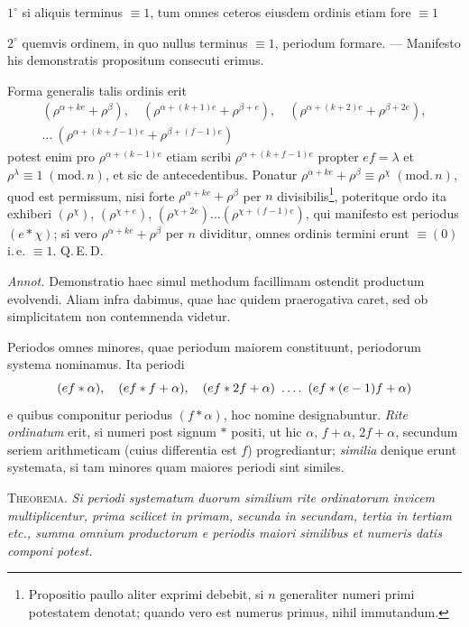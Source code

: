 %
\par\noindent $1^\circ$ si aliquis terminus $\equiv1$, tum omnes ceteros eiusdem ordinis etiam fore $\equiv1$

\noindent $2^\circ$ quemvis ordinem, in quo nullus terminus $\equiv1$, periodum formare. --- Manifesto his demonstratis propositum consecuti erimus.

Forma generalis talis ordinis erit
\[
\begin{gathered}
(\rho^{\alpha+ke}+\rho^\beta),\quad(\rho^{\alpha+(k+1)e}+\rho^{\beta+e}),\quad(\rho^{\alpha+(k+2)e}+\rho^{\beta+2e}),\\
\ldots\ (\rho^{\alpha+(k+f-1)e}+\rho^{\beta+(f-1)e})
\end{gathered}
\]
potest enim pro $\rho^{\alpha+(k-1)e}$ etiam scribi $\rho^{\alpha+(k+f-1)e}$ propter $ef=\lambda$ et $\rho^\lambda\equiv1\;(\mathrm{mod.}\,n)$, et sic de antecedentibus. Ponatur $\rho^{\alpha+ke}+\rho^\beta\equiv\rho^\chi\;(\mathrm{mod.}\,n)$, quod est permissum, nisi forte $\rho^{\alpha+ke}+\rho^\beta$ per $n$ divisibilis\begingroup\renewcommand{\thefootnote}{*)}\footnote{Propositio paullo aliter exprimi debebit, si $n$ generaliter numeri primi potestatem denotat; quando vero est numerus primus, nihil immutandum.}\endgroup, poteritque ordo ita exhiberi $(\rho^\chi)$, $(\rho^{\chi+e})$, $(\rho^{\chi+2e})\ldots(\rho^{\chi+(f-1)e})$, qui manifesto est periodus $(e\ast\chi)$; si vero $\rho^{\alpha+ke}+\rho^\beta$ per $n$ dividitur, omnes ordinis termini erunt $\equiv(0)$ i.\,e. $\equiv1$. Q.\,E.\,D.

\emph{Annot.} Demonstratio haec simul methodum facillimam ostendit productum evolvendi. Aliam infra dabimus, quae hac quidem praerogativa caret, sed ob simplicitatem non contemnenda videtur.

Periodos omnes minores, quae periodum maiorem constituunt, periodorum systema nominamus. Ita periodi
\[
(ef\ast\alpha),\quad(ef\ast f+\alpha),\quad(ef\ast2f+\alpha)\ \dotsfour\ (ef\ast(e-1)f+\alpha)
\]
e quibus componitur periodus $(f\ast\alpha)$, hoc nomine designabuntur. \emph{Rite ordinatum} erit, si numeri post signum $\ast$ positi, ut hic $\alpha$, $f+\alpha$, $2f+\alpha$, secundum seriem arithmeticam (cuius differentia est $f$) progrediantur; \emph{similia} denique erunt systemata, si tam minores quam maiores periodi sint similes.

\textsc{Theorema.} \emph{Si periodi systematum duorum similium rite ordinatorum invicem multiplicentur, prima scilicet in primam, secunda in secundam, tertia in tertiam etc., summa omnium productorum e periodis maiori similibus et numeris datis componi potest.}


